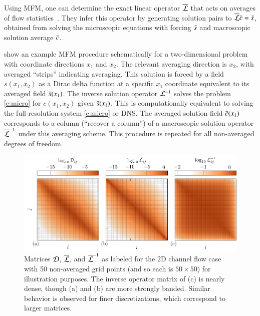 Using MFM, one can determine the exact linear operator $\overline{\mathcal{L}}$ that acts on averages of flow statistics~\citep{maniMacroscopicForcingMethod2021}.
They infer this operator by generating solution pairs to $\overline{\mathcal{L}} \bar{c} = \bar{s}$, obtained from solving the microscopic equations with forcing $\bar{s}$ and macroscopic solution average $\bar{c}$.

 show an example MFM procedure schematically for a two-dimensional problem with coordinate directions $x_1$ and $x_2$.
The relevant averaging direction is $x_2$, with averaged ``strips'' indicating averaging.
This solution is forced by a field $s(x_1,x_2)$ as a Dirac delta function  at a specific $x_1$ coordinate equivalent to its averaged field $\bar{s}(x_1)$.
The inverse solution operator $\mathcal{L}^{-1}$ solves the problem \eqref{e:micro} for $c(x_1,x_2)$ given $\bar{s}(x_1)$.
This is computationally equivalent to solving the full-resolution system \eqref{e:micro} or DNS.
The averaged solution field $\bar{c}(x_1)$ corresponds to a column (``recover a column'') of a macroscopic solution operator $\overline{\mathcal{L}}^{-1}$ under this averaging scheme.
This procedure is repeated for all non-averaged degrees of freedom.

\begin{figure}
    \centering
    \includegraphics{figures/matrices.pdf}
    \caption{
        Matrices $\mathcal{D}$, $\overline{\mathcal{L}}$, and $\overline{\mathcal{L}}^{-1}$ as labeled for the 2D channel flow case with 50 non-averaged grid points (and so each is $50 \times 50$) for illustration purposes.
        The inverse operator matrix of (c) is nearly dense, though (a) and (b) are more strongly banded.
        Similar behavior is observed for finer discretizations, which correspond to larger matrices.
    } 
    \label{fig:mfmeddy}
\end{figure}


